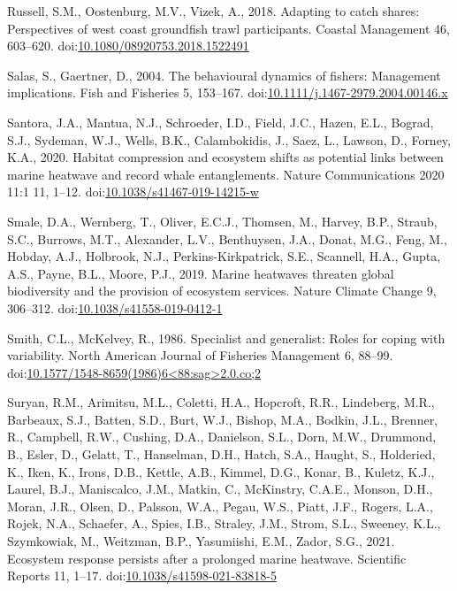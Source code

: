 \documentclass[]{elsarticle} %
\begin{document}
\leavevmode\hypertarget{ref-Russell2018}{}%
Russell, S.M., Oostenburg, M.V., Vizek, A., 2018. Adapting to catch
shares: Perspectives of west coast groundfish trawl participants.
Coastal Management 46, 603--620.
doi:\href{https://doi.org/10.1080/08920753.2018.1522491}{10.1080/08920753.2018.1522491}

\leavevmode\hypertarget{ref-Salas2004a}{}%
Salas, S., Gaertner, D., 2004. The behavioural dynamics of fishers:
Management implications. Fish and Fisheries 5, 153--167.
doi:\href{https://doi.org/10.1111/j.1467-2979.2004.00146.x}{10.1111/j.1467-2979.2004.00146.x}

\leavevmode\hypertarget{ref-Santora2020}{}%
Santora, J.A., Mantua, N.J., Schroeder, I.D., Field, J.C., Hazen, E.L.,
Bograd, S.J., Sydeman, W.J., Wells, B.K., Calambokidis, J., Saez, L.,
Lawson, D., Forney, K.A., 2020. Habitat compression and ecosystem shifts
as potential links between marine heatwave and record whale
entanglements. Nature Communications 2020 11:1 11, 1--12.
doi:\href{https://doi.org/10.1038/s41467-019-14215-w}{10.1038/s41467-019-14215-w}

\leavevmode\hypertarget{ref-Smale2019}{}%
Smale, D.A., Wernberg, T., Oliver, E.C.J., Thomsen, M., Harvey, B.P.,
Straub, S.C., Burrows, M.T., Alexander, L.V., Benthuysen, J.A., Donat,
M.G., Feng, M., Hobday, A.J., Holbrook, N.J., Perkins-Kirkpatrick, S.E.,
Scannell, H.A., Gupta, A.S., Payne, B.L., Moore, P.J., 2019. Marine
heatwaves threaten global biodiversity and the provision of ecosystem
services. Nature Climate Change 9, 306--312.
doi:\href{https://doi.org/10.1038/s41558-019-0412-1}{10.1038/s41558-019-0412-1}

\leavevmode\hypertarget{ref-Smith1986}{}%
Smith, C.L., McKelvey, R., 1986. Specialist and generalist: Roles for
coping with variability. North American Journal of Fisheries Management
6, 88--99.
doi:\href{https://doi.org/10.1577/1548-8659(1986)6\%3C88:sag\%3E2.0.co;2}{10.1577/1548-8659(1986)6\textless88:sag\textgreater2.0.co;2}

\leavevmode\hypertarget{ref-Suryan2021}{}%
Suryan, R.M., Arimitsu, M.L., Coletti, H.A., Hopcroft, R.R., Lindeberg,
M.R., Barbeaux, S.J., Batten, S.D., Burt, W.J., Bishop, M.A., Bodkin,
J.L., Brenner, R., Campbell, R.W., Cushing, D.A., Danielson, S.L., Dorn,
M.W., Drummond, B., Esler, D., Gelatt, T., Hanselman, D.H., Hatch, S.A.,
Haught, S., Holderied, K., Iken, K., Irons, D.B., Kettle, A.B., Kimmel,
D.G., Konar, B., Kuletz, K.J., Laurel, B.J., Maniscalco, J.M., Matkin,
C., McKinstry, C.A.E., Monson, D.H., Moran, J.R., Olsen, D., Palsson,
W.A., Pegau, W.S., Piatt, J.F., Rogers, L.A., Rojek, N.A., Schaefer, A.,
Spies, I.B., Straley, J.M., Strom, S.L., Sweeney, K.L., Szymkowiak, M.,
Weitzman, B.P., Yasumiishi, E.M., Zador, S.G., 2021. Ecosystem response
persists after a prolonged marine heatwave. Scientific Reports 11,
1--17.
doi:\href{https://doi.org/10.1038/s41598-021-83818-5}{10.1038/s41598-021-83818-5}
\end{document}
